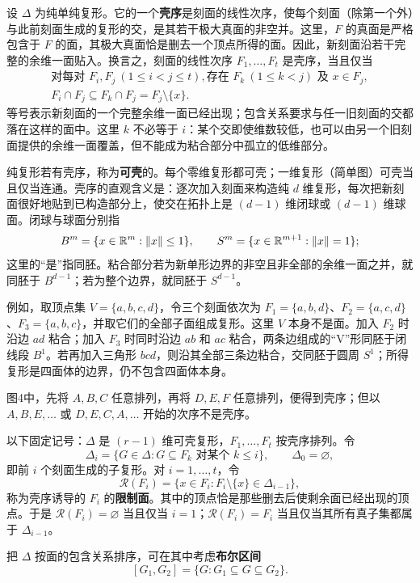 设 $\Delta$ 为纯单纯复形。它的一个\textbf{壳序}是刻面的线性次序，使每个刻面（除第一个外）与此前刻面生成的复形的交，是其若干极大真面的非空并。这里，$F$ 的真面是严格包含于 $F$ 的面，其极大真面恰是删去一个顶点所得的面。因此，新刻面沿若干完整的余维一面贴入。换言之，刻面的线性次序 $F_1,\ldots,F_t$ 是壳序，当且仅当
\[\begin{gathered}
\text{对每对 }F_i,F_j\ (1\le i<j\le t),\text{存在 }F_k\ (1\le k<j)\text{ 及 }x\in F_j,\\
F_i\cap F_j\subseteq F_k\cap F_j=F_j\setminus\{x\}.
\end{gathered}\tag{5}\label{eq:shell-condition}\]
等号表示新刻面的一个完整余维一面已经出现；包含关系要求与任一旧刻面的交都落在这样的面中。这里 $k$ 不必等于 $i$：某个交即使维数较低，也可以由另一个旧刻面提供的余维一面覆盖，但不能成为粘合部分中孤立的低维部分。

纯复形若有壳序，称为\textbf{可壳}的。每个零维复形都可壳；一维复形（简单图）可壳当且仅当连通。壳序的直观含义是：逐次加入刻面来构造纯 $d$ 维复形，每次把新刻面很好地贴到已构造部分上，使交在拓扑上是 $(d-1)$ 维闭球或 $(d-1)$ 维球面。闭球与球面分别指
\[B^m=\{x\in\mathbb R^m:\|x\|\le1\},\qquad S^m=\{x\in\mathbb R^{m+1}:\|x\|=1\};\]
这里的“是”指同胚。粘合部分若为新单形边界的非空且非全部的余维一面之并，就同胚于 $B^{d-1}$；若为整个边界，就同胚于 $S^{d-1}$。

例如，取顶点集 $V=\{a,b,c,d\}$，令三个刻面依次为 $F_1=\{a,b,d\}$、$F_2=\{a,c,d\}$、$F_3=\{a,b,c\}$，并取它们的全部子面组成复形。这里 $V$ 本身不是面。加入 $F_2$ 时沿边 $ad$ 粘合；加入 $F_3$ 时同时沿边 $ab$ 和 $ac$ 粘合，两条边组成的“V”形同胚于闭线段 $B^1$。若再加入三角形 $bcd$，则沿其全部三条边粘合，交同胚于圆周 $S^1$；所得复形是四面体的边界，仍不包含四面体本身。

图4中，先将 $A,B,C$ 任意排列，再将 $D,E,F$ 任意排列，便得到壳序；但以 $A,B,E,\ldots$ 或 $D,E,C,A,\ldots$ 开始的次序不是壳序。

以下固定记号：$\Delta$ 是 $(r-1)$ 维可壳复形，$F_1,\ldots,F_t$ 按壳序排列。令
\[\Delta_i=\{G\in\Delta:G\subseteq F_k\text{ 对某个 }k\le i\},\qquad\Delta_0=\varnothing,\]
即前 $i$ 个刻面生成的子复形。对 $i=1,\ldots,t$，令
\[\mathcal R(F_i)=\{x\in F_i:F_i\setminus\{x\}\in\Delta_{i-1}\},\]
称为壳序诱导的 $F_i$ 的\textbf{限制面}。其中的顶点恰是那些删去后使剩余面已经出现的顶点。于是 $\mathcal R(F_i)=\varnothing$ 当且仅当 $i=1$；$\mathcal R(F_i)=F_i$ 当且仅当其所有真子集都属于 $\Delta_{i-1}$。

把 $\Delta$ 按面的包含关系排序，可在其中考虑\textbf{布尔区间}
\[[G_1,G_2]=\{G:G_1\subseteq G\subseteq G_2\}.\]

